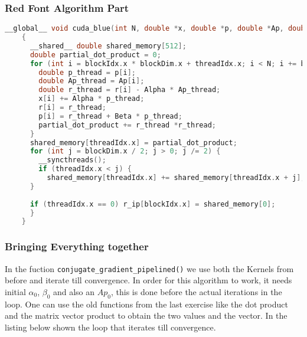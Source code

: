 \subsubsection{Red Font Algorithm Part}
\begin{lstlisting}[language=C++, title=Kernels for Red Algorithm Part]
    __global__ void cuda_blue(int N, double *x, double *p, double *Ap, double *r, double *r_ip, double Alpha, double Beta)
    {
      __shared__ double shared_memory[512];
      double partial_dot_product = 0;
      for (int i = blockIdx.x * blockDim.x + threadIdx.x; i < N; i += blockDim.x * gridDim.x){
        double p_thread = p[i];
        double Ap_thread = Ap[i];
        double r_thread = r[i] - Alpha * Ap_thread;
        x[i] += Alpha * p_thread;
        r[i] = r_thread;
        p[i] = r_thread + Beta * p_thread;
        partial_dot_product += r_thread *r_thread;
      }
      shared_memory[threadIdx.x] = partial_dot_product;
      for (int j = blockDim.x / 2; j > 0; j /= 2) {
        __syncthreads();
        if (threadIdx.x < j) {
          shared_memory[threadIdx.x] += shared_memory[threadIdx.x + j];
      }
      
      if (threadIdx.x == 0) r_ip[blockIdx.x] = shared_memory[0];
      }
    }
    \end{lstlisting}

\pagebreak

\subsubsection{Bringing Everything together}
In the fuction \texttt{conjugate\_gradient\_pipelined()} we use both the Kernels from before and iterate till convergence.
In order for this algorithm to work, it needs initial $\alpha_0$, $\beta_0$ and also an $Ap_0$, this is done before
the actual iterations in the  loop. One can use the old functions from the last exercise like the dot product
and the matrix vector product to obtain the two values and the vector. In the listing below shown the  loop that
iterates till convergence.

